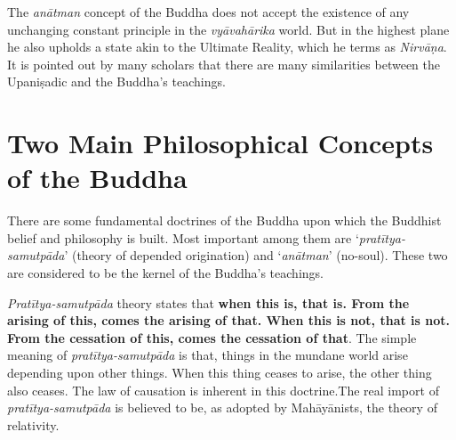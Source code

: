 The \textit{anātman} concept of the Buddha does not accept the existence of any unchanging constant principle in the \textit{vyāvahārika} world. But in the highest plane he also upholds a state akin to the Ultimate Reality, which he terms as \textit{Nirvāṇa}. It is pointed out by many scholars that there are many similarities between the Upaniṣadic and the Buddha’s teachings.


\section*{Two Main Philosophical Concepts of the Buddha}

There are some fundamental doctrines of the Buddha upon which the Buddhist belief and philosophy is built. Most important among them are ‘\textit{pratītya-samutpāda}’ (theory of depended origination) and ‘\textit{anātman}’ (no-soul). These two are considered to be the kernel of the Buddha’s teachings.

\textit{Pratītya-samutpāda} theory states that \textbf{when this is, that is. From the arising of this, comes the arising of that. When this is not, that is not. From the cessation of this, comes the cessation of that}. The simple meaning of \textit{pratītya-samutpāda} is that, things in the mundane world arise depending upon other things. When this thing ceases to arise, the other thing also ceases. The law of causation is inherent in this doctrine.The real import of \textit{pratītya-samutpāda} is believed to be, as adopted by Mahāyānists, the theory of relativity.

